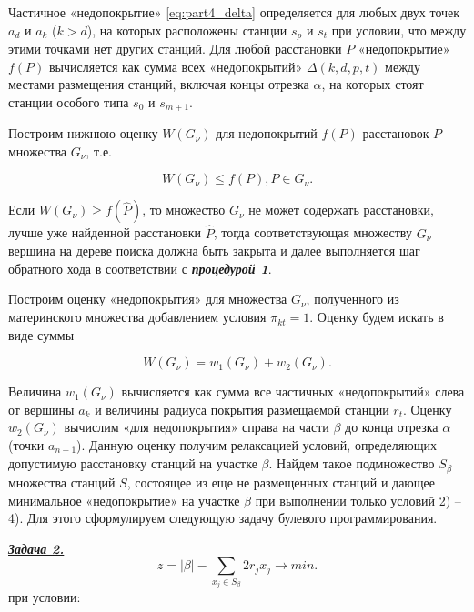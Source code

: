 Частичное «недопокрытие» \cref{eq:part4_delta} определяется для любых двух точек $a_d$ и $a_k$ ($k>d$), на которых расположены станции $s_p$ и $s_t$ при условии, что между этими точками нет других станций. Для любой расстановки $P$ «недопокрытие» $f(P)$ вычисляется как сумма всех «недопокрытий» $\Delta(k,d,p,t)$ между местами размещения станций, включая концы отрезка $\alpha$, на которых стоят станции особого типа $s_0$ и $s_{m+1}$.

Построим нижнюю оценку $W(G_{\nu} )$ для недопокрытий $f(P)$ расстановок $P$ множества $G_\nu$, т.е. 

\begin{displaymath}
W(G_\nu) \leq f(P), P \in G_\nu. 
\end{displaymath}

Если $W(G_\nu) \geq f(\widehat{P})$, то множество $G_\nu$ не может содержать расстановки, лучше уже найденной расстановки $\widehat{P}$, тогда соответствующая множеству $G_\nu$  вершина на дереве поиска должна быть закрыта и далее выполняется шаг обратного хода в соответствии с  \textit{\textbf{процедурой 1}}. 

Построим оценку «недопокрытия» для множества $G_\nu$, полученного из материнского множества добавлением условия $\pi_{kt}=1$. Оценку будем искать в виде суммы

\begin{equation}
  \label{eq:part4_noncoverage_estimation}
  W\left(G_\nu\right) = w_1 \left(G_\nu \right) + w_2 \left(G_\nu \right). 
\end{equation}

Величина $w_1 \left(G_\nu \right)$ вычисляется как сумма все частичных «недопокрытий» слева от вершины $a_k$ и величины радиуса покрытия размещаемой станции $r_t$. Оценку $w_2 \left(G_\nu \right)$ вычислим «для недопокрытия» справа на части $\beta$ до конца отрезка $\alpha$ (точки $a_{n+1}$). Данную оценку получим релаксацией условий, определяющих допустимую расстановку станций на участке $\beta$. Найдем такое подмножество $S_\beta$ множества станций $S$, состоящее из еще не размещенных станций и дающее минимальное «недопокрытие» на участке $\beta$ при выполнении только условий 2) – 4). Для этого сформулируем следующую задачу булевого программирования.

\underline{\textit{\textbf{Задача 2.}}}
\begin{displaymath}
    z = |\beta| - \sum\limits_{x_j \in S_\beta} 2r_j x_j \rightarrow min.
\end{displaymath}
при условии:

